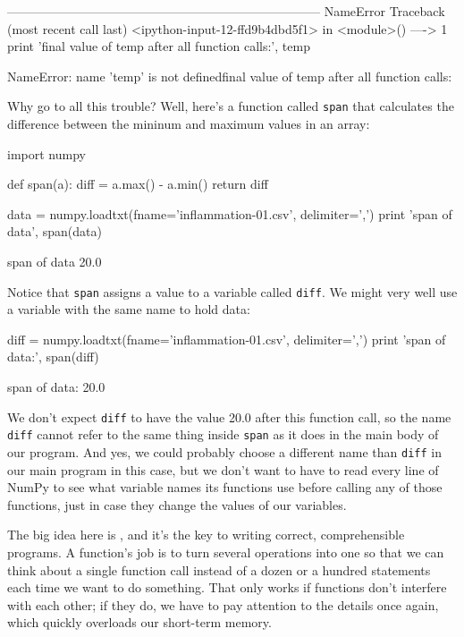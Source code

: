 \begin{VerbErr}
---------------------------------------------------------------------------
NameError                                 Traceback (most recent call last)
<ipython-input-12-ffd9b4dbd5f1> in <module>()
----> 1 print 'final value of temp after all function calls:', temp

NameError: name 'temp' is not definedfinal value of temp after all function calls:
\end{VerbErr}

Why go to all this trouble? Well, here's a function called \texttt{span}
that calculates the difference between the mininum and maximum values in
an array:

\begin{VerbIn}
import numpy

def span(a):
    diff = a.max() - a.min()
    return diff

data = numpy.loadtxt(fname='inflammation-01.csv', delimiter=',')
print 'span of data', span(data)
\end{VerbIn}

\begin{VerbOut}
 span of data 20.0
\end{VerbOut}

Notice that \texttt{span} assigns a value to a variable called
\texttt{diff}. We might very well use a variable with the same name to
hold data:

\begin{VerbIn}
diff = numpy.loadtxt(fname='inflammation-01.csv', delimiter=',')
print 'span of data:', span(diff)
\end{VerbIn}

\begin{VerbOut}
span of data: 20.0
\end{VerbOut}

We don't expect \texttt{diff} to have the value 20.0 after this function
call, so the name \texttt{diff} cannot refer to the same thing inside
\texttt{span} as it does in the main body of our program. And yes, we
could probably choose a different name than \texttt{diff} in our main
program in this case, but we don't want to have to read every line of
NumPy to see what variable names its functions use before calling any of
those functions, just in case they change the values of our variables.

The big idea here is , and it's
the key to writing correct, comprehensible programs. A function's job is
to turn several operations into one so that we can think about a single
function call instead of a dozen or a hundred statements each time we
want to do something. That only works if functions don't interfere with
each other; if they do, we have to pay attention to the details once
again, which quickly overloads our short-term memory.

